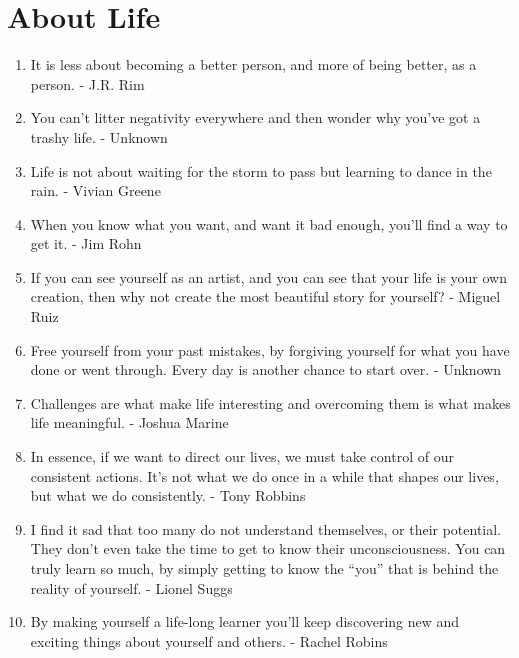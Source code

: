     \section*{About Life}
        \begin{enumerate}
            \item It is less about becoming a better person, and more of being better, as a person. - J.R. Rim

            \item You can’t litter negativity everywhere and then wonder why you’ve got a trashy life. - Unknown

            \item Life is not about waiting for the storm to pass but learning to dance in the rain. - Vivian Greene

            \item When you know what you want, and want it bad enough, you’ll find a way to get it. - Jim Rohn

            \item If you can see yourself as an artist, and you can see that your life is your own creation, then why not create the most beautiful story for yourself? - Miguel Ruiz

            \item Free yourself from your past mistakes, by forgiving yourself for what you have done or went through. Every day is another chance to start over. - Unknown

            \item Challenges are what make life interesting and overcoming them is what makes life meaningful. - Joshua Marine

            \item In essence, if we want to direct our lives, we must take control of our consistent actions. It’s not what we do once in a while that shapes our lives, but what we do consistently. - Tony Robbins

            \item I find it sad that too many do not understand themselves, or their potential. They don’t even take the time to get to know their unconsciousness. You can truly learn so much, by simply getting to know the “you” that is behind the reality of yourself. - Lionel Suggs

            \item By making yourself a life-long learner you’ll keep discovering new and exciting things about yourself and others. - Rachel Robins


\end{enumerate}

